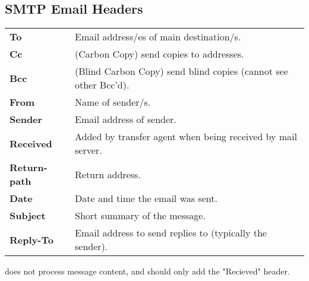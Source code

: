 \documentclass{report}
\begin{document}
\subsection*{SMTP Email Headers}
\begin{center}
	\begin{tabular}{l p{}}
		\textbf{To}          & Email address/es of main destination/s.                         \\
		\textbf{Cc}          & (Carbon Copy) send copies to addresses.                         \\
		\textbf{Bcc}         & (Blind Carbon Copy) send blind copies (cannot see other Bcc'd). \\
		\textbf{From}        & Name of sender/s.                                               \\
		\textbf{Sender}      & Email address of sender.                                        \\
		\textbf{Received}    & Added by transfer agent when being received by mail server.     \\
		\textbf{Return-path} & Return address.                                                 \\
		\textbf{Date}        & Date and time the email was sent.                               \\
		\textbf{Subject}     & Short summary of the message.                                   \\
		\textbf{Reply-To}    & Email address to send replies to (typically the sender).        \\
	\end{tabular}
\end{center}
 does not process message content, and should only add the "Recieved" header.
\end{document}
